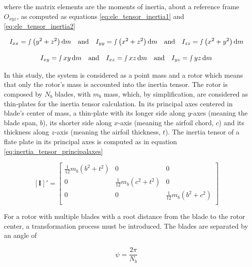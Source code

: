 where the matrix elements are the moments of inertia, about a reference frame $O_{xyz}$, as computed as equations \ref{eq:ele_tensor_inertia1} and \ref{eq:ele_tensor_inertia2}

\begin{equation}
    I_{xx} = \smallint  \left( y^2 + z^2 \right) \mathrm{d}m \quad \text{and} \quad I_{yy} = \smallint  \left( x^2 + z^2 \right) \mathrm{d}m \quad \text{and} \quad I_{zz} = \smallint  \left( x^2 + y^2 \right) \mathrm{d}m
    \label{eq:ele_tensor_inertia1}
\end{equation}


\begin{equation}
    I_{xy} = \smallint  xy \, \mathrm{d}m \quad \text{and} \quad I_{xz} = \smallint  xz \, \mathrm{d}m \quad \text{and} \quad I_{yz} = \smallint  yz \, \mathrm{d}m
    \label{eq:ele_tensor_inertia2}
\end{equation}

In this study, the system is considered as a point mass and a rotor which means that only the rotor's mass is accounted into the inertia tensor. The rotor is composed by $N_b$ blades, with $m_b$ mass, which, by simplification, are considered as thin-plates for the inertia tensor calculation. In its principal axes centered in blade's center of mass, a thin-plate with its longer side along $y$-axes (meaning the blade span, $b$), its shorter side along $x$-axis (meaning the airfoil chord, $c$) and its thickness along $z$-axis (meaning the airfoil thickness, $t$). The inertia tensor of a flate plate in its principal axes is computed as in equation \ref{eq:inertia_tensor_principalaxes}

\begin{equation}
    \left[\mathbf{I}\right]' = 
    \begin{bmatrix}
        \frac{1}{12}m_b(b^2+t^2) & 0 & 0\\
        0 & \frac{1}{12}m_b(c^2+t^2) & 0\\
        0 & 0 & \frac{1}{12}m_b(b^2+c^2)\\
    \end{bmatrix}
    \label{eq:inertia_tensor_principalaxes}
\end{equation}

For a rotor with multiple blades with a root distance from the blade to the rotor center, a transformation process must be introduced. The blades are separated by an angle of

\begin{equation}
    \psi = \frac{2\pi}{N_b}
\end{equation}

